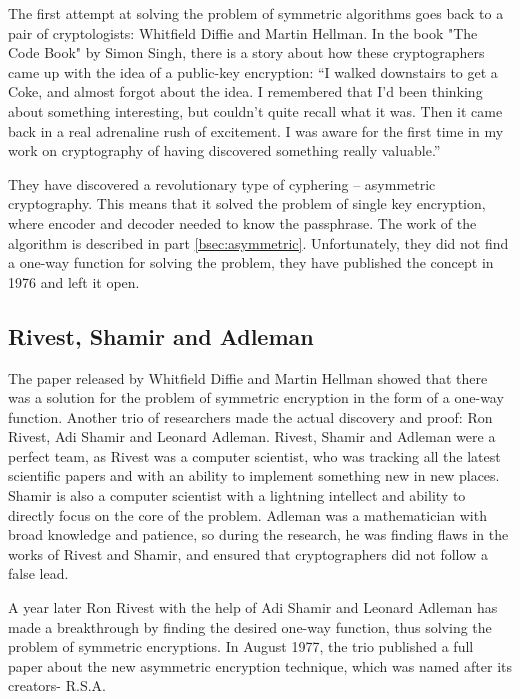 \documentclass[a4paper, 12pt]{article}
\begin{document}
The first attempt at solving the problem of symmetric algorithms goes back to a pair of
cryptologists: Whitfield Diffie and Martin Hellman. In the book "The Code Book" by Simon
Singh, there is a story about how these cryptographers came up with the idea of a public-key
encryption: “I walked downstairs to get a Coke, and almost forgot about the idea. I remembered
that I'd been thinking about something interesting, but couldn't quite recall what it was. Then it
came back in a real adrenaline rush of excitement. I was aware for the first time in my work on
cryptography of having discovered something really valuable.” \cite{singh}

They have discovered a revolutionary type of cyphering – asymmetric cryptography. This means that it solved the problem of
single key encryption, where encoder and decoder needed to know the passphrase. The work of
the algorithm is described in part \ref{bsec:asymmetric}. Unfortunately, they did not find a one-way function for
solving the problem, they have published the concept in 1976 and left it open.

\subsection{Rivest, Shamir and Adleman}
\label{bsec:rsa}

The paper released by Whitfield Diffie and Martin Hellman showed that there was a solution for
the problem of symmetric encryption in the form of a one-way function. Another trio of researchers
made the actual discovery and proof: Ron Rivest, Adi Shamir and Leonard Adleman. Rivest,
Shamir and Adleman were a perfect team, as Rivest was a computer scientist, who was tracking
all the latest scientific papers and with an ability to implement something new in new places.
Shamir is also a computer scientist with a lightning intellect and ability to directly focus on the
core of the problem. Adleman was a mathematician with broad knowledge and patience, so during
the research, he was finding flaws in the works of Rivest and Shamir, and ensured that
cryptographers did not follow a false lead.\cite{singh}

A year later Ron Rivest with the help of Adi Shamir
and Leonard Adleman has made a breakthrough by finding the desired one-way function, thus
solving the problem of symmetric encryptions. In August 1977, the trio published a full paper
about the new asymmetric encryption technique, which was named after its creators- R.S.A.\cite{rsapaper}
\end{document}
